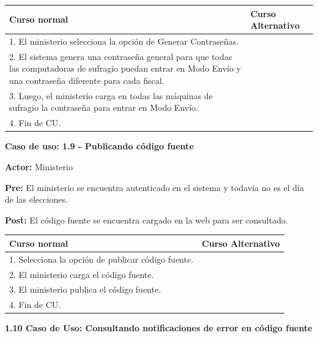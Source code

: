\begin{table}[h!]
	
 \begin{tabular}{|p{7.5cm} | p{7.5cm}|} 
 \hline
 \textbf{Curso normal} & \textbf{Curso Alternativo} \\
 \hline

1. El ministerio selecciona la opción de Generar Contraseñas. & \\
\hline

2. El sistema genera una contraseña general para que todas las computadoras de sufragio puedan entrar en Modo Envío y una contraseña diferente para cada fiscal. & \\
\hline

3. Luego, el ministerio carga en todas las máquinas de sufragio la contraseña para entrar en Modo Envío. & \\
\hline

4. Fin de CU. & \\
\hline

\end{tabular}
\end{table}
\textbf{Caso de uso: 1.9 - Publicando código fuente}

\textbf{Actor:} Ministerio

\textbf{Pre:} El ministerio se encuentra autenticado en el sistema y todavía no es el día de las elecciones.

\textbf{Post:} El código fuente se encuentra cargado en la web para ser consultado. 

\begin{table}[h!]
	
 \begin{tabular}{|p{7.5cm} | p{7.5cm}|} 
 \hline
 \textbf{Curso normal} & \textbf{Curso Alternativo} \\
 \hline
 
1. Selecciona la opción de publicar código fuente. & \\
\hline

2. El ministerio carga el código fuente. & \\
\hline

3. El ministerio publica el código fuente. & \\
\hline

4. Fin de CU. & \\
\hline
\end{tabular}
\end{table}

\textbf{1.10 Caso de Uso: Consultando notificaciones de error en código fuente}

